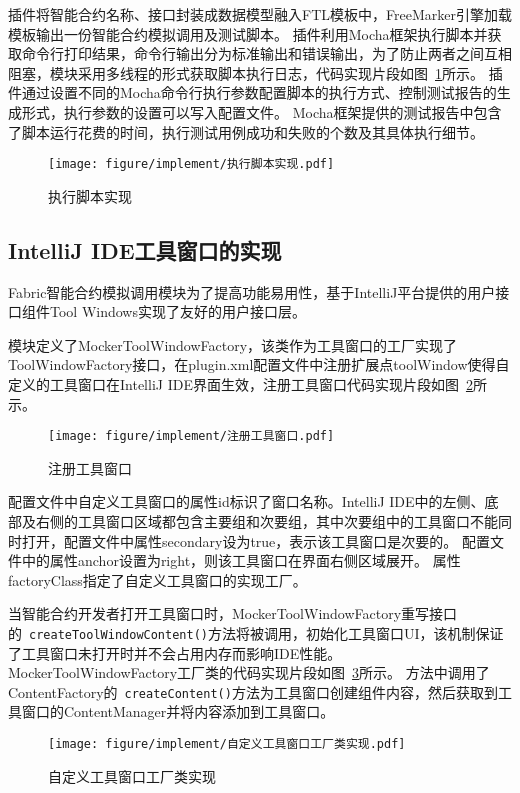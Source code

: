插件将智能合约名称、接口封装成数据模型融入FTL模板中，FreeMarker引擎加载模板输出一份智能合约模拟调用及测试脚本。
插件利用Mocha框架执行脚本并获取命令行打印结果，命令行输出分为标准输出和错误输出，为了防止两者之间互相阻塞，模块采用多线程的形式获取脚本执行日志，代码实现片段如图~\ref{fig:5.18}所示。
插件通过设置不同的Mocha命令行执行参数配置脚本的执行方式、控制测试报告的生成形式，执行参数的设置可以写入配置文件。
Mocha框架提供的测试报告中包含了脚本运行花费的时间，执行测试用例成功和失败的个数及其具体执行细节。

\begin{figure}[htb]
  \centering
  \texttt{[image: figure/implement/执行脚本实现.pdf]}
  \caption{执行脚本实现}\label{fig:5.18}
\end{figure}

\subsection{IntelliJ IDE工具窗口的实现}

Fabric智能合约模拟调用模块为了提高功能易用性，基于IntelliJ平台提供的用户接口组件Tool Windows实现了友好的用户接口层。

模块定义了MockerToolWindowFactory，该类作为工具窗口的工厂实现了ToolWindowFactory接口，在plugin.xml配置文件中注册扩展点toolWindow使得自定义的工具窗口在IntelliJ IDE界面生效，注册工具窗口代码实现片段如图~\ref{fig:5.19}所示。

\begin{figure}[htb]
  \centering
  \texttt{[image: figure/implement/注册工具窗口.pdf]}
  \caption{注册工具窗口}\label{fig:5.19}
\end{figure}

配置文件中自定义工具窗口的属性id标识了窗口名称。IntelliJ IDE中的左侧、底部及右侧的工具窗口区域都包含主要组和次要组，其中次要组中的工具窗口不能同时打开，配置文件中属性secondary设为true，表示该工具窗口是次要的。
配置文件中的属性anchor设置为right，则该工具窗口在界面右侧区域展开。
属性factoryClass指定了自定义工具窗口的实现工厂。

当智能合约开发者打开工具窗口时，MockerToolWindowFactory重写接口的~\texttt{createToolWindowContent()}方法将被调用，初始化工具窗口UI，该机制保证了工具窗口未打开时并不会占用内存而影响IDE性能。
MockerToolWindowFactory工厂类的代码实现片段如图~\ref{fig:5.20}所示。
方法中调用了ContentFactory的~\texttt{createContent()}方法为工具窗口创建组件内容，然后获取到工具窗口的ContentManager并将内容添加到工具窗口。

\begin{figure}[htb]
  \centering
  \texttt{[image: figure/implement/自定义工具窗口工厂类实现.pdf]}
  \caption{自定义工具窗口工厂类实现}\label{fig:5.20}
\end{figure}

